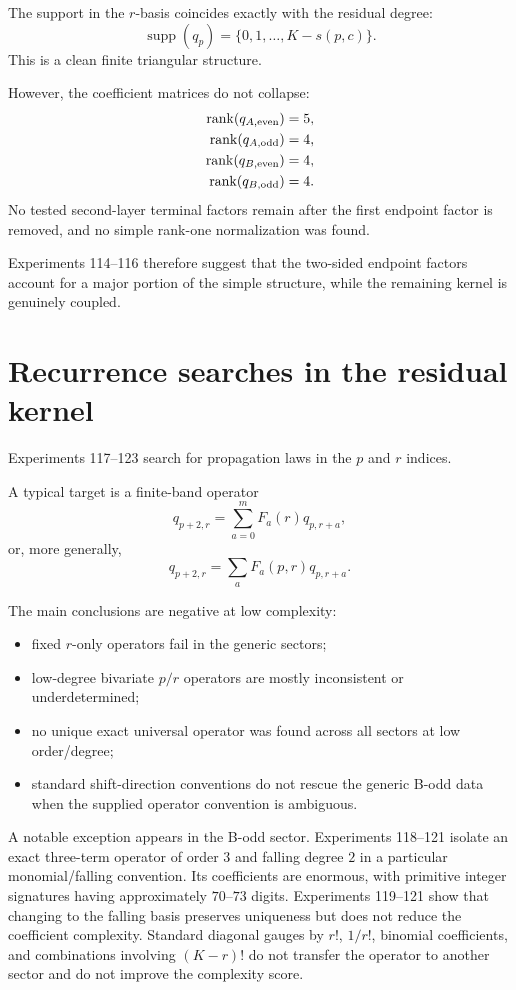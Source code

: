 \documentclass[11pt,a4paper]{article}
\newcommand{\rank}{\operatorname{rank}}
\begin{document}
The support in the $r$-basis coincides exactly with the residual degree:
\[
\operatorname{supp}(q_p)=\{0,1,\ldots,K-s(p,c)\}.
\]
This is a clean finite triangular structure.

However, the coefficient matrices do not collapse:
\begin{align*}
\rank(q_{A,\rm even})&=5,\\
\rank(q_{A,\rm odd})&=4,\\
\rank(q_{B,\rm even})&=4,\\
\rank(q_{B,\rm odd})&=4.
\end{align*}
No tested second-layer terminal factors remain after the first endpoint factor is removed, and no simple rank-one normalization was found.

Experiments 114--116 therefore suggest that the two-sided endpoint factors account for a major portion of the simple structure, while the remaining kernel is genuinely coupled.

\section{Recurrence searches in the residual kernel}

Experiments 117--123 search for propagation laws in the $p$ and $r$ indices.

A typical target is a finite-band operator
\begin{equation}
\label{eq:operator}
q_{p+2,r}=\sum_{a=0}^{m}F_a(r)q_{p,r+a},
\end{equation}
or, more generally,
\[
q_{p+2,r}=\sum_aF_a(p,r)q_{p,r+a}.
\]

The main conclusions are negative at low complexity:
\begin{itemize}
  \item fixed $r$-only operators fail in the generic sectors;
  \item low-degree bivariate $p/r$ operators are mostly inconsistent or underdetermined;
  \item no unique exact universal operator was found across all sectors at low order/degree;
  \item standard shift-direction conventions do not rescue the generic B-odd data when the supplied operator convention is ambiguous.
\end{itemize}

A notable exception appears in the B-odd sector.  Experiments 118--121 isolate an exact three-term operator of order $3$ and falling degree $2$ in a particular monomial/falling convention.  Its coefficients are enormous, with primitive integer signatures having approximately $70$--$73$ digits.  Experiments 119--121 show that changing to the falling basis preserves uniqueness but does not reduce the coefficient complexity.  Standard diagonal gauges by $r!$, $1/r!$, binomial coefficients, and combinations involving $(K-r)!$ do not transfer the operator to another sector and do not improve the complexity score.
\end{document}
